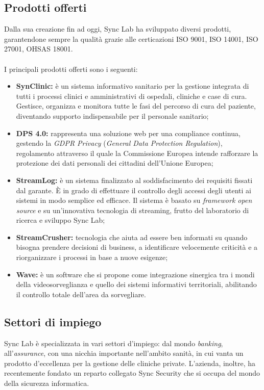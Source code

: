 \subsection{Prodotti offerti}
Dalla sua creazione fin ad oggi, Sync Lab ha sviluppato diversi prodotti,
garantendone sempre la qualità grazie alle certicazioni ISO 9001, ISO 14001, ISO 27001, OHSAS 18001.\\\\
I principali prodotti offerti sono i seguenti:
\begin{itemize}
	\item{\textbf{SynClinic: }è un sistema informativo sanitario per la gestione integrata di tutti i processi clinici e amministrativi di ospedali, cliniche e case di cura. Gestisce, organizza e monitora tutte le fasi del percorso di cura del paziente, diventando supporto indispensabile per il personale sanitario;}
	\item{\textbf{DPS 4.0: }rappresenta una soluzione web per una compliance continua, gestendo la \textit{GDPR Privacy} (\textit{General Data Protection Regulation}), regolamento attraverso il quale la Commissione Europea intende rafforzare la protezione dei dati personali dei cittadini dell’Unione Europea;}
	\item{\textbf{StreamLog: }è un sistema finalizzato al soddisfacimento dei requisiti fissati dal garante. È in grado di effettuare il controllo degli accessi degli utenti ai sistemi in modo semplice ed efficace. Il sistema è basato su \textit{framework open source} e su un’innovativa tecnologia di streaming, frutto del laboratorio di ricerca e sviluppo Sync Lab;}
	\item{\textbf{StreamCrusher: }tecnologia che aiuta ad essere ben informati su quando bisogna prendere decisioni di business, a identificare velocemente criticità e a riorganizzare i processi in base a nuove esigenze;}
	\item{\textbf{Wave: } è un software che si propone come integrazione sinergica tra i mondi della videosorveglianza e quello dei sistemi informativi territoriali, abilitando il controllo totale dell'area da sorvegliare.}
\end{itemize}

\subsection{Settori di impiego}
Sync Lab è specializzata in vari settori d’impiego: dal mondo \textit{banking}, all’\textit{assurance}, con una nicchia importante nell’ambito sanità, in cui vanta un prodotto d’eccellenza per la gestione delle cliniche private. L’azienda, inoltre, ha recentemente fondato un reparto collegato Sync Security che si occupa del mondo della sicurezza informatica.

